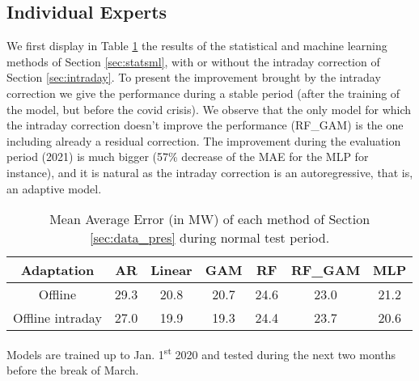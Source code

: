 \documentclass[transmag]{IEEEtran}
\begin{document}
\subsection{Individual Experts}\label{sec:exp_indiv}
We first display in Table \ref{tab:indiv_offline} the results of the statistical and machine learning methods of Section \ref{sec:statsml}, with or without the intraday correction of Section \ref{sec:intraday}. To present the improvement brought by the intraday correction we give the performance during a stable period (after the training of the model, but before the covid crisis). We observe that the only model for which the intraday correction doesn't improve the performance (RF\_GAM) is the one including already a residual correction. The improvement during the evaluation period (2021) is much bigger (57\% decrease of the MAE for the MLP for instance), and it is natural as the intraday correction is an autoregressive, that is, an adaptive model.
\begin{table}
    \begin{center}
    \caption{Mean Average Error (in MW) of each method of Section \ref{sec:data_pres} during normal test period.}
    \label{tab:indiv_offline}
    \begin{tabular}{|c|c|c|c|c|c|c|}
        \hline
        Adaptation & AR & Linear & GAM & RF & RF\_GAM & MLP \\
        \hline
        Offline & 29.3 & 20.8 & 20.7 & 24.6 & 23.0 & 21.2 \\
        Offline intraday & 27.0 & 19.9 & 19.3 & 24.4 & 23.7 & 20.6 \\
        \hline
    \end{tabular}
    \end{center}
    Models are trained up to Jan. 1\textsuperscript{st} 2020 and tested during the next two months before the break of March.
\end{table}
\end{document}
